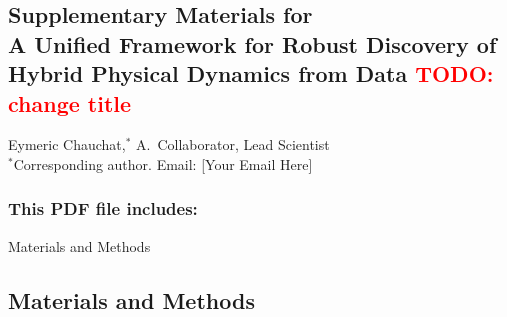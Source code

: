 \documentclass[12pt]{article}
\newcommand{\TODO}[1]{\textbf{\textcolor{red}{\Large TODO: \normalsize #1}}}
\def\scititle{
	A Unified Framework for Robust Discovery of Hybrid Physical Dynamics from Data \TODO{change title}
}
\begin{document}

\newpage
\appendix

\renewcommand{\thefigure}{S\arabic{figure}}
\renewcommand{\thetable}{S\arabic{table}}
\renewcommand{\theequation}{S\arabic{equation}}
\renewcommand{\thepage}{S\arabic{page}}
\setcounter{figure}{0}
\setcounter{table}{0}
\setcounter{equation}{0}
\setcounter{page}{1}


\begin{center}
\section*{Supplementary Materials for\\ \scititle}
Eymeric Chauchat,$^{\ast}$ A.~Collaborator, Lead Scientist\\
\small$^\ast$Corresponding author. Email: [Your Email Here]
\end{center}

\subsubsection*{This PDF file includes:}
Materials and Methods

\newpage


\subsection*{Materials and Methods}
\end{document}
